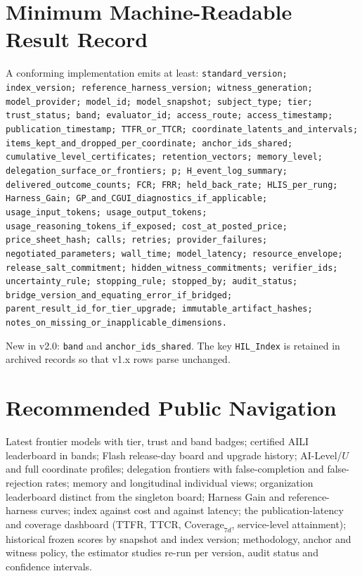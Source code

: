 \section{Minimum Machine-Readable Result Record}\label{app:record}
\begingroup\raggedright\small
A conforming implementation emits at least: \texttt{standard\_version; index\_version; reference\_harness\_version; witness\_generation; model\_provider; model\_id; model\_snapshot; subject\_type; tier; trust\_status; band; evaluator\_id; access\_route; access\_timestamp; publication\_timestamp; TTFR\_or\_TTCR; coordinate\_latents\_and\_intervals; items\_kept\_and\_dropped\_per\_coordinate; anchor\_ids\_shared; cumulative\_level\_certificates; retention\_vectors; memory\_level; delegation\_surface\_or\_frontiers; p; H\_event\_log\_summary; delivered\_outcome\_counts; FCR; FRR; held\_back\_rate; HLIS\_per\_rung; Harness\_Gain; GP\_and\_CGUI\_diagnostics\_if\_applicable; usage\_input\_tokens; usage\_output\_tokens; usage\_reasoning\_tokens\_if\_exposed; cost\_at\_posted\_price; price\_sheet\_hash; calls; retries; provider\_failures; negotiated\_parameters; wall\_time; model\_latency; resource\_envelope; release\_salt\_commitment; hidden\_witness\_commitments; verifier\_ids; uncertainty\_rule; stopping\_rule; stopped\_by; audit\_status; bridge\_version\_and\_equating\_error\_if\_bridged; parent\_result\_id\_for\_tier\_upgrade; immutable\_artifact\_hashes; notes\_on\_missing\_or\_inapplicable\_dimensions.}
\par\endgroup
\noindent New in v2.0: \texttt{band} and \texttt{anchor\_ids\_shared}. The key \texttt{HIL\_Index} is retained in archived records so that v1.x rows parse unchanged.

\section{Recommended Public Navigation}\label{app:navigation}
Latest frontier models with tier, trust and band badges; certified AILI leaderboard in bands; Flash release-day board and upgrade history; AI-Level/$U$ and full coordinate profiles; delegation frontiers with false-completion and false-rejection rates; memory and longitudinal individual views; organization leaderboard distinct from the singleton board; Harness Gain and reference-harness curves; index against cost and against latency; the publication-latency and coverage dashboard (TTFR, TTCR, $\mathrm{Coverage}_{7d}$, service-level attainment); historical frozen scores by snapshot and index version; methodology, anchor and witness policy, the estimator studies re-run per version, audit status and confidence intervals.

